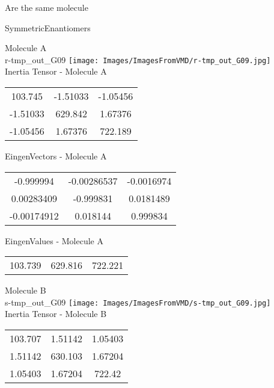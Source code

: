 \begin{center}
\vtab
\vtab
\textcolor{NavyBlue}{\Large Are the same molecule}
\end{center}
\newpage

\vtab[-2cm]
\begin{center}
{\large SymmetricEnantiomers}
\end{center}
\begin{multicols}{2}
\begin{center}
Molecule A \\ 
r-tmp\_out\_G09
\texttt{[image: Images/ImagesFromVMD/r-tmp\_out\_G09.jpg]}
\\
Inertia Tensor - Molecule A \\
\vtab
\begin{tabular}{|c c c|}
103.745	 & 	-1.51033	 & 	-1.05456	 \\
-1.51033	 & 	629.842	 & 	1.67376	 \\
-1.05456	 & 	1.67376	 & 	722.189
\end{tabular}

\vtab
 EingenVectors - Molecule A     \\
\vtab
\begin{tabular}{|c c c|}
-0.999994	 & 	-0.00286537	 & 	-0.0016974	 \\
0.00283409	 & 	-0.999831	 & 	0.0181489	 \\
-0.00174912	 & 	0.018144	 & 	0.999834
\end{tabular}

\vtab
 EingenValues - Molecule A     \\
\vtab
\begin{tabular}{|c c c|}
103.739	 & 	629.816	 & 	722.221
\end{tabular}
\columnbreak

Molecule B \\ 
s-tmp\_out\_G09
\texttt{[image: Images/ImagesFromVMD/s-tmp\_out\_G09.jpg]}
\\
Inertia Tensor - Molecule B \\
\vtab
\begin{tabular}{|c c c|}
103.707	 & 	1.51142	 & 	1.05403	 \\
1.51142	 & 	630.103	 & 	1.67204	 \\
1.05403	 & 	1.67204	 & 	722.42
\end{tabular}


\end{center}
\end{multicols}
